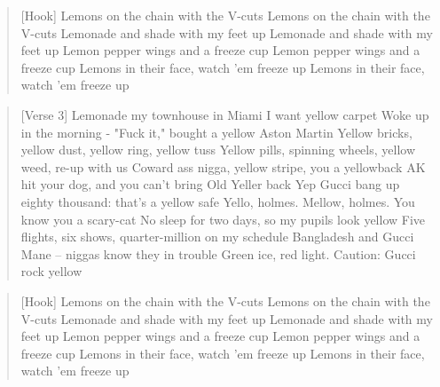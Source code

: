 \documentclass{book}
\begin{document}
\begin{verse}
{[}Hook]
Lemons on the chain with the V-cuts
Lemons on the chain with the V-cuts
Lemonade and shade with my feet up
Lemonade and shade with my feet up
Lemon pepper wings and a freeze cup
Lemon pepper wings and a freeze cup
Lemons in their face, watch 'em freeze up
Lemons in their face, watch 'em freeze up
\end{verse}
\begin{verse}
{[}Verse 3]
Lemonade my townhouse in Miami I want yellow carpet
Woke up in the morning - "Fuck it," bought a yellow Aston Martin
Yellow bricks, yellow dust, yellow ring, yellow tuss
Yellow pills, spinning wheels, yellow weed, re-up with us
Coward ass nigga, yellow stripe, you a yellowback
AK hit your dog, and you can't bring Old Yeller back
Yep Gucci bang up eighty thousand: that's a yellow safe
Yello, holmes. Mellow, holmes. You know you a scary-cat
No sleep for two days, so my pupils look yellow
Five flights, six shows, quarter-million on my schedule
Bangladesh and Gucci Mane – niggas know they in trouble
Green ice, red light. Caution: Gucci rock yellow
\end{verse}
\begin{verse}
{[}Hook]
Lemons on the chain with the V-cuts
Lemons on the chain with the V-cuts
Lemonade and shade with my feet up
Lemonade and shade with my feet up
Lemon pepper wings and a freeze cup
Lemon pepper wings and a freeze cup
Lemons in their face, watch 'em freeze up
Lemons in their face, watch 'em freeze up
\end{verse}
\end{document}
